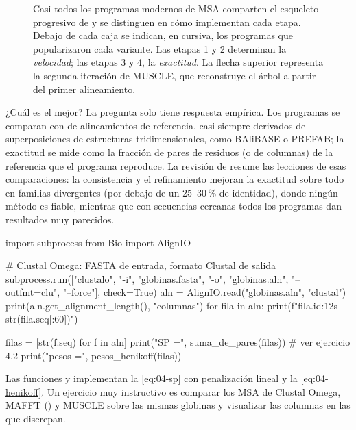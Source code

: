 \begin{figure}[tbp]
\caption[Anatomía de un programa moderno de MSA]{Casi todos los programas modernos de MSA comparten el esqueleto progresivo de \textcite{c04-feng1987} y se distinguen en cómo implementan cada etapa. Debajo de cada caja se indican, en cursiva, los programas que popularizaron cada variante. Las etapas 1 y 2 determinan la \emph{velocidad}; las etapas 3 y 4, la \emph{exactitud}. La flecha superior representa la segunda iteración de MUSCLE, que reconstruye el árbol a partir del primer alineamiento.}
\label{fig:04-metodos}
\end{figure}


¿Cuál es el mejor? La pregunta solo tiene respuesta empírica. Los programas se comparan con  de alineamientos de referencia, casi siempre derivados de superposiciones de estructuras tridimensionales, como BAliBASE o PREFAB; la exactitud se mide como la fracción de pares de residuos (o de columnas) de la referencia que el programa reproduce. La revisión de \textcite{c04-edgar2006} resume las lecciones de esas comparaciones: la consistencia y el refinamiento mejoran la exactitud sobre todo en familias divergentes (por debajo de un 25--30\,\% de identidad), donde ningún método es fiable, mientras que con secuencias cercanas todos los programas dan resultados muy parecidos.

\begin{codigo}
import subprocess
from Bio import AlignIO

# Clustal Omega: FASTA de entrada, formato Clustal de salida
subprocess.run(["clustalo", "-i", "globinas.fasta",
                "-o", "globinas.aln", "--outfmt=clu",
                "--force"], check=True)
aln = AlignIO.read("globinas.aln", "clustal")
print(aln.get_alignment_length(), "columnas")
for fila in aln:
    print(f"{fila.id:12s} {str(fila.seq[:60])}")

filas = [str(f.seq) for f in aln]
print("SP =", suma_de_pares(filas))        # ver ejercicio 4.2
print("pesos =", pesos_henikoff(filas))
\end{codigo}

\noindent Las funciones  y  implementan la \cref{eq:04-sp} con penalización lineal y la \cref{eq:04-henikoff}. Un ejercicio muy instructivo es comparar los MSA de Clustal Omega, MAFFT () y MUSCLE sobre las mismas globinas y visualizar las columnas en las que discrepan.


